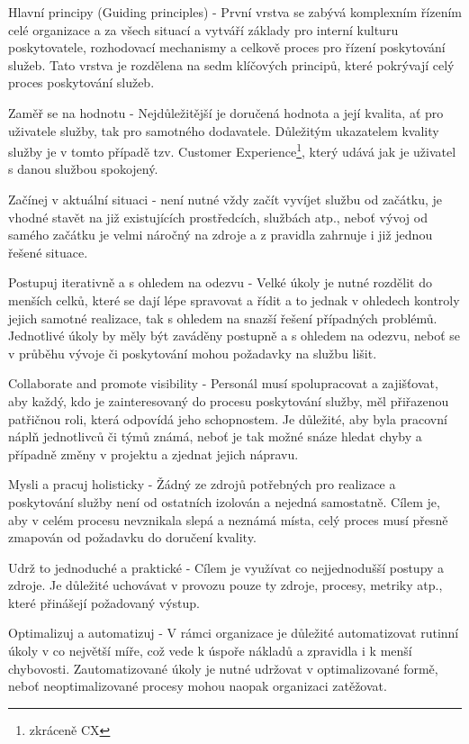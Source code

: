 \documentclass[
  digital,     %
  twoside,     %
  lof,         %
  lot,         %
]{fithesis4}
\begin{document}
\begin{compactitem}
    \item Hlavní principy (Guiding principles) - První vrstva se zabývá komplexním řízením celé organizace a za všech situací a vytváří základy pro interní kulturu poskytovatele, rozhodovací mechanismy a celkově proces pro řízení poskytování služeb. Tato vrstva je rozdělena na sedm klíčových principů, které pokrývají celý proces poskytování služeb. 
    \begin{compactitem}
      \item Zaměř se na hodnotu - Nejdůležitější je doručená hodnota a její kvalita, ať pro uživatele služby, tak pro samotného dodavatele. Důležitým ukazatelem kvality služby je v tomto případě tzv. Customer Experience\footnote{zkráceně CX}, který udává jak je uživatel s danou službou spokojený.
      \item Začínej v aktuální situaci - není nutné vždy začít vyvíjet službu od začátku, je vhodné stavět na již existujících prostředcích, službách atp., neboť vývoj od samého začátku je velmi náročný na zdroje a z pravidla zahrnuje i již jednou řešené situace. 
      \item Postupuj iterativně a s ohledem na odezvu - Velké úkoly je nutné rozdělit do menších celků, které se dají lépe spravovat a řídit a to jednak v ohledech kontroly jejich samotné realizace, tak s ohledem na snazší řešení případných problémů. Jednotlivé úkoly by měly být zaváděny postupně a s ohledem na odezvu, neboť se v průběhu vývoje či poskytování mohou požadavky na službu lišit. 
      \item Collaborate and promote visibility - Personál musí spolupracovat a zajišťovat, aby každý, kdo je zainteresovaný do procesu poskytování služby, měl přiřazenou patřičnou roli, která odpovídá jeho schopnostem. Je důležité, aby byla pracovní náplň jednotlivců či týmů známá, neboť je tak možné snáze hledat chyby a případně změny v projektu a zjednat jejich nápravu.
      \item Mysli a pracuj holisticky - Žádný ze zdrojů potřebných pro realizace a poskytování služby není od ostatních izolován a nejedná samostatně. Cílem je, aby v celém procesu nevznikala slepá a neznámá místa, celý proces musí přesně zmapován od požadavku do doručení kvality.
      \item Udrž to jednoduché a praktické - Cílem je využívat co nejjednodušší postupy a zdroje. Je důležité uchovávat v provozu pouze ty zdroje, procesy, metriky atp., které přinášejí požadovaný výstup. 
      \item Optimalizuj a automatizuj - V rámci organizace je důležité automatizovat rutinní úkoly v co největší míře, což vede k úspoře nákladů a zpravidla i k menší chybovosti. Zautomatizované úkoly je nutné udržovat v optimalizované formě, neboť neoptimalizované procesy mohou naopak organizaci zatěžovat.

\end{compactitem}
\end{compactitem}
\end{document}
